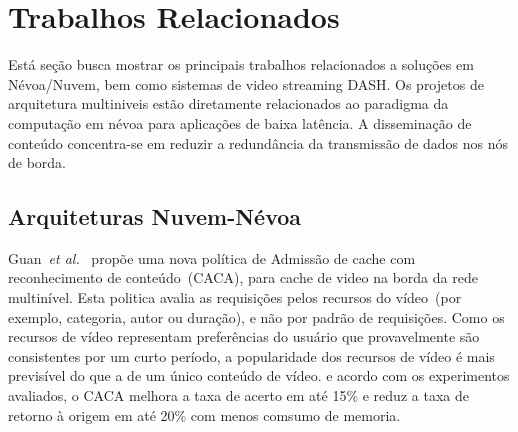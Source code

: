 \section{Trabalhos Relacionados}
\label{ch:related-work}

Está seção busca mostrar os principais trabalhos relacionados a soluções em Névoa/Nuvem, bem como sistemas de video streaming DASH. 
Os projetos de arquitetura multiniveis estão diretamente relacionados ao paradigma da computação em névoa para aplicações de baixa latência. A disseminação de conteúdo concentra-se em reduzir a redundância da transmissão de dados nos nós de borda.



\subsection{Arquiteturas Nuvem-Névoa}
\label{subsec:arch-cloud-fog}


Guan~\textit{et al.}~\cite{guan:2019:CLC} propõe uma nova política de Admissão de cache com reconhecimento de conteúdo~(CACA), para cache de video na borda da rede multinível. Esta politica avalia as requisições pelos recursos do vídeo~(por exemplo, categoria, autor ou duração), e não por padrão de requisições. Como os recursos de vídeo representam preferências do usuário que provavelmente são consistentes por um curto período, a popularidade dos recursos de vídeo é mais previsível do que a de um único conteúdo de vídeo. e acordo com os experimentos avaliados, o CACA melhora a taxa de acerto em até 15\% e reduz a taxa de retorno à origem em até 20\% com menos comsumo de memoria.

